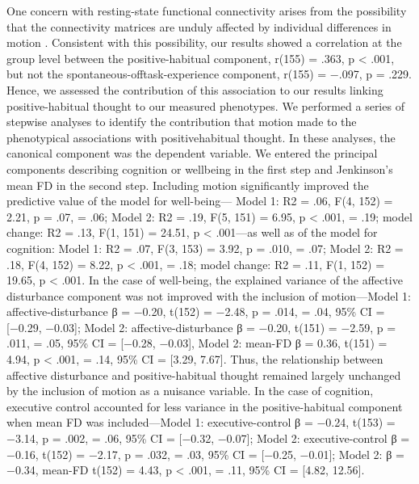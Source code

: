 One concern with resting-state functional connectivity arises from the possibility that the connectivity matrices are unduly affected by individual differences in motion \cite{Power2014}. Consistent with this possibility, our results showed a correlation at the group level between the positive-habitual component, r(155) = .363, p < .001, but not the spontaneous-offtask-experience component, r(155) = −.097, p = .229. Hence, we assessed the contribution of this association to our results linking positive-habitual thought to our measured phenotypes. We performed a series of stepwise analyses to identify the contribution that motion made to the phenotypical associations with positivehabitual thought. In these analyses, the canonical component was the dependent variable. We entered the principal components describing cognition or wellbeing in the first step and Jenkinson’s mean FD in the second step. Including motion significantly improved the predictive value of the model for well-being— Model 1: R2 = .06, F(4, 152) = 2.21, p = .07, \paretasquared = .06; Model 2: R2 = .19, F(5, 151) = 6.95, p < .001, \paretasquared = .19; model change: R2 = .13, F(1, 151) = 24.51, p < .001—as well as of the model for cognition: Model 1: R2 = .07, F(3, 153) = 3.92, p = .010, \paretasquared = .07; Model 2: R2 = .18, F(4, 152) = 8.22, p < .001, \paretasquared = .18; model change: R2 = .11, F(1, 152) = 19.65, p < .001. In the case of well-being, the explained variance of the affective disturbance component was not improved with the inclusion of motion—Model 1: affective-disturbance β = −0.20, t(152) = −2.48, p = .014, \paretasquared = .04, 95\% CI = [−0.29, −0.03]; Model 2: affective-disturbance β = −0.20, t(151) = −2.59, p = .011, \paretasquared = .05, 95\% CI = [−0.28, −0.03], Model 2: mean-FD β = 0.36, t(151) = 4.94, p < .001, \paretasquared = .14, 95\% CI = [3.29, 7.67]. Thus, the relationship between affective disturbance and positive-habitual thought remained largely unchanged by the inclusion of motion as a nuisance variable. In the case of cognition, executive control accounted for less variance in the positive-habitual component when mean FD was included—Model 1: executive-control β = −0.24, t(153) = −3.14, p = .002, \paretasquared = .06, 95\% CI = [−0.32, −0.07]; Model 2: executive-control β = −0.16, t(152) = −2.17, p = .032, \paretasquared = .03, 95\% CI = [−0.25, −0.01]; Model 2: β = −0.34, mean-FD t(152) = 4.43, p < .001, \paretasquared = .11, 95\% CI = [4.82, 12.56].

